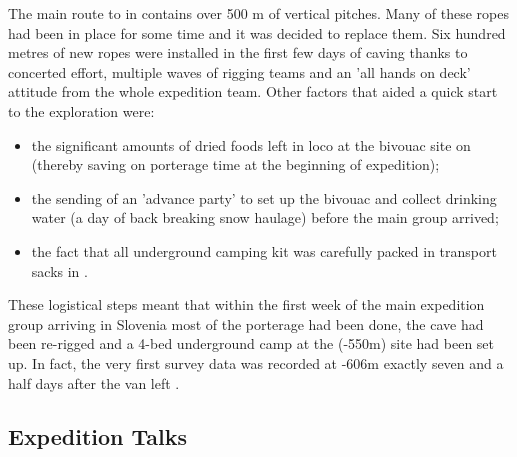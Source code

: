 The main route to  in  contains over 500
m of vertical pitches. Many of these ropes had been in place for some time and it was decided to replace them. Six hundred metres of new ropes were installed in the first few days of caving thanks to concerted effort, multiple waves of rigging teams and an 'all hands on deck' attitude
from the whole expedition team.  Other factors that aided a quick start to the
exploration were:



\begin{itemize}
\item the significant amounts of dried foods left in loco at the bivouac
site on  (thereby saving on porterage time at the beginning of expedition); 
\item the sending of an 'advance party' to set up the bivouac and collect drinking water (a day of back breaking snow haulage) before the main group arrived; 
\item the fact that all underground camping kit was carefully packed in transport sacks in . 
\end{itemize}
These logistical steps meant that within the first week of the main expedition group arriving in Slovenia most of the porterage had been done, the cave had been re-rigged and a 4-bed underground camp at the  (-550m) site had been set up. In fact, the very first survey
data was recorded at -606m exactly seven and a half days after the van left .


\subsection{Expedition Talks}

